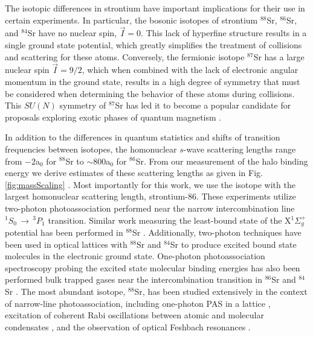 The isotopic differences in strontium have important implications for their use in certain experiments.
In particular, the bosonic isotopes of strontium $^{88}$Sr, $^{86}$Sr, and $^{84}$Sr have no nuclear spin, $\vec{I}=0$.
This lack of hyperfine structure results in a single ground state potential, which greatly simplifies the treatment of collisions and scattering for these atoms.
Conversely, the fermionic isotope $^{87}$Sr has a large nuclear spin $\vec{I}=9/2$, which when combined with the lack of electronic angular momentum in the ground state, results in a high degree of symmetry that must be considered when determining the behavior of these atoms during collisions.
This $SU(N)$ symmetry of $^{87}$Sr has led it to become a popular candidate for proposals exploring exotic phases of quantum magnetism \cite{Beverland2016,cre14,Chen2015}.

In addition to the differences in quantum statistics and shifts of transition frequencies between isotopes, the homonuclear $s$-wave scattering lengths range from $-2$a$_0$ for $^{88}$Sr to $\sim 800$a$_0$ for $^{86}$Sr.
From our measurement of the halo binding energy we derive estimates of these scattering lengths as given in Fig.\,\ref{fig:massScaling} \cite{Aman2018}.
Most importantly for this work, we use the isotope with the largest homonuclear scattering length, strontium-86.
These experiments utilize two-photon photoassociation performed near the narrow intercombination line $^1S_0\,\rightarrow\,^3P_1$ transition.
Similar work measuring the least-bound state of the X$^1\Sigma_g^+$ potential has been performed in $^{88}$Sr \cite{MartinezDeEscobar2008}.
Additionally, two-photon techniques have been used in optical lattices with $^{88}$Sr \cite{Reinaudi2012, McGuyer2014, McGuyer2015a, rom12} and $^{84}$Sr \cite{Stellmer2012} to produce excited bound state molecules in the electronic ground state.
One-photon photoassociation spectroscopy probing the excited state molecular binding energies has also been performed bulk trapped gases near the intercombination transition in $^{86}$Sr \cite{Borkowski2014a, Reschovsky} and $^{84}$Sr \cite{Stellmer2012, Reschovsky}.
The most abundant isotope, $^{88}$Sr, has been studied extensively in the context of narrow-line photoassociation, including one-photon PAS in a lattice \cite{Zelevinsky2006,McGuyer2013}, excitation of coherent Rabi oscillations between atomic and molecular condensates \cite{Yan2013b}, and the observation of optical Feshbach resonances \cite{Yan2013c, Blatt}.

